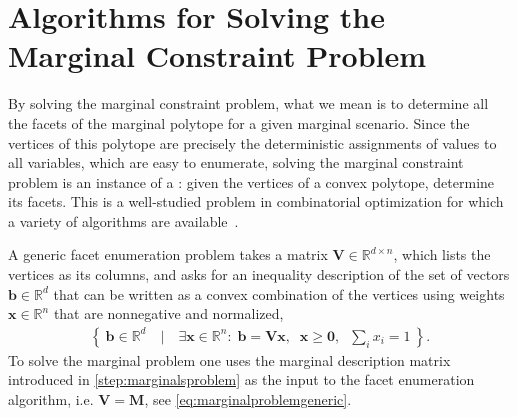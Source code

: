 \documentclass[aps,english,10pt,superscriptaddress,onecolumn,twoside,longbibliography,pra,floatfix,fleqn,nofootinbib]{revtex4-1}
\newcommand*{\tblue}[1]{{\color{medblue}{\textbf{#1}}}}
\theoremstyle{definition}
\begin{document}
\section{Algorithms for Solving the Marginal Constraint Problem}\label{sec:projalgorithms}

By solving the marginal constraint problem, what we mean is to determine all the facets of the marginal polytope for a given marginal scenario. Since the vertices of this polytope are precisely the deterministic assignments of values to all variables, which are easy to enumerate, solving the marginal constraint problem is an instance of a \tblue{facet enumeration problem}: given the vertices of a convex polytope, determine its facets. This is a well-studied problem in combinatorial optimization for which a variety of algorithms are available~\cite{avis_convexhull_2015}. 

A generic facet enumeration problem takes a matrix $\bm{V}\in\mathbb{R}^{d\times n}$, which lists the vertices as its columns, and asks for an inequality description of the set of vectors $\bm{b}\in\mathbb{R}^d$ that can be written as a convex combination of the vertices using weights $\bm{x}\in\mathbb{R}^n$ that are nonnegative and normalized,
\begin{align}
	\label{projsimplex}
	\left\{\: \bm{b}\in\mathbb{R}^d \quad\bigg|\quad \exists \bm{x}\in\mathbb{R}^n:\; \bm{b} = \bm{V}\bm{x} ,\;\; \bm{x}\geq \bm{0},\;\; {{\sum_i}{x_i}}=1 \:\right\}.
\end{align}
To solve the marginal problem one uses the marginal description matrix introduced in \cref{step:marginalsproblem} as the input to the facet enumeration algorithm, i.e. $\bm{V}=\bm{M}$, see \cref{eq:marginalproblemgeneric}.
\end{document}
